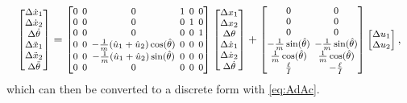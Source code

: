 \documentclass[10pt,a4paper]{article} %
\begin{document}
\begin{equation}
	\setlength\arraycolsep{2pt}
	\footnotesize %
	\begin{bmatrix} \Delta\dot{x}_1 \\ \Delta\dot{x}_2 \\ \Delta\dot{\theta} \\ \Delta\ddot{x}_1 \\ \Delta\ddot{x}_2 \\ \Delta\ddot{\theta} \end{bmatrix} =
	\begin{bmatrix} 0 & 0 & 0 & 1 & 0 & 0 \\ 
					0 & 0 & 0 & 0 & 1 & 0 \\
					0 & 0 & 0 & 0 & 0 & 1 \\
					0 & 0 & -\frac{1}{m} (\hat{u}_1 + \hat{u}_2) \cos(\hat{\theta}) & 0 & 0 & 0 \\
					0 & 0 & -\frac{1}{m} (\hat{u}_1 + \hat{u}_2) \sin(\hat{\theta}) & 0 & 0 & 0 \\
					0 & 0 & 0 & 0 & 0 & 0 
	\end{bmatrix} 
	\begin{bmatrix} \Delta x_1 \\ \Delta x_2 \\ \Delta\theta \\ \Delta\dot{x}_1 \\ \Delta\dot{x}_2 \\ \Delta\dot{\theta} \end{bmatrix}
	+ 
	\setlength\arraycolsep{2pt}
	\footnotesize %
	\begin{bmatrix} 0 & 0 \\ 0 & 0 \\ 0 & 0 \\ 
	-\frac{1}{m} \sin(\hat{\theta}) & -\frac{1}{m} \sin(\hat{\theta}) \\ 
	\frac{1}{m} \cos(\hat{\theta}) & \frac{1}{m} \cos(\hat{\theta}) \\ 
	\frac{\ell}{I} & -\frac{\ell}{I} \end{bmatrix} 
	\begin{bmatrix} \Delta u_1 \\ \Delta u_2 \end{bmatrix},
\end{equation}
which can then be converted to a discrete form with \eqref{eq:AdAc}.



\end{document}
